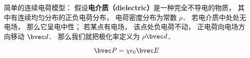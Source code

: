 
简单的连续电荷模型： 假设\textbf{电介质（dielectric）}是一种完全不导电的物质， 其中有连续均匀分布的正负电荷分布， 电荷密度分布为常数 $\rho$． 若电介质中处处无电场， 那么它呈电中性； 若某点有电场， 该点处负电荷不动， 正电荷向电场方向移动 $\bvec d$． 那么我们就把极化率定义为 $\rho \bvec d$．



\begin{equation}
\bvec P = \chi \epsilon_0 \bvec E
\end{equation}
